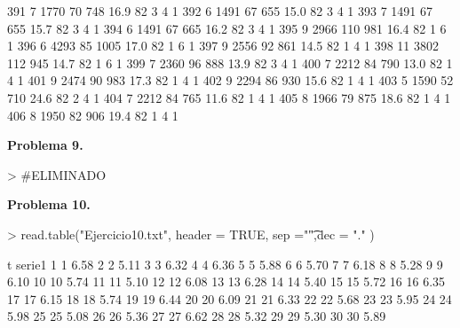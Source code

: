 \documentclass{article}
\begin{document}
\begin{Schunk}
\begin{Soutput}
391       7  1770  70  748 16.9  82      3       4        1
392       6  1491  67  655 15.0  82      3       4        1
393       7  1491  67  655 15.7  82      3       4        1
394       6  1491  67  665 16.2  82      3       4        1
395       9  2966 110  981 16.4  82      1       6        1
396       6  4293  85 1005 17.0  82      1       6        1
397       9  2556  92  861 14.5  82      1       4        1
398      11  3802 112  945 14.7  82      1       6        1
399       7  2360  96  888 13.9  82      3       4        1
400       7  2212  84  790 13.0  82      1       4        1
401       9  2474  90  983 17.3  82      1       4        1
402       9  2294  86  930 15.6  82      1       4        1
403       5  1590  52  710 24.6  82      2       4        1
404       7  2212  84  765 11.6  82      1       4        1
405       8  1966  79  875 18.6  82      1       4        1
406       8  1950  82  906 19.4  82      1       4        1
\end{Soutput}
\end{Schunk}
\newpage
\textbf{Problema 9.}
\begin{Schunk}
\begin{Sinput}
> #ELIMINADO
\end{Sinput}
\end{Schunk}
\textbf{Problema 10.}
\begin{Schunk}
\begin{Sinput}
> read.table("Ejercicio10.txt", header = TRUE, sep ="\t",dec = "." )
\end{Sinput}
\begin{Soutput}
    t serie1
1   1   6.58
2   2   5.11
3   3   6.32
4   4   6.36
5   5   5.88
6   6   5.70
7   7   6.18
8   8   5.28
9   9   6.10
10 10   5.74
11 11   5.10
12 12   6.08
13 13   6.28
14 14   5.40
15 15   5.72
16 16   6.35
17 17   6.15
18 18   5.74
19 19   6.44
20 20   6.09
21 21   6.33
22 22   5.68
23 23   5.95
24 24   5.98
25 25   5.08
26 26   5.36
27 27   6.62
28 28   5.32
29 29   5.30
30 30   5.89
\end{Soutput}
\end{Schunk}
\end{document}
